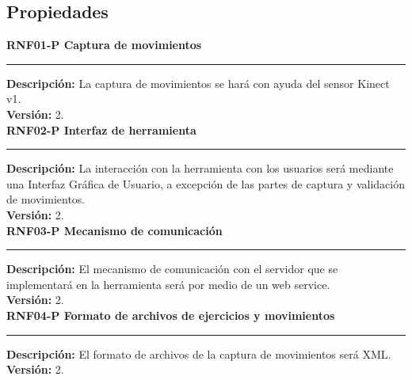 

\subsection{Propiedades}

\textbf{\textcolor[rgb]{0, 0, 0.545098}{RNF01-P \hspace{2cm} Captura de movimientos}}\\
\rule[3mm]{17cm}{0.1mm}
\label{rnf:RNF01-P}
\textbf{Descripción: } La captura de movimientos se hará con ayuda del sensor Kinect v1. \\
\textbf{Versión: } 2. \\

\textbf{\textcolor[rgb]{0, 0, 0.545098}{RNF02-P \hspace{2cm} Interfaz de herramienta}}\\
\rule[3mm]{17cm}{0.1mm}
\label{rnf:RNF02-P}
\textbf{Descripción: } La interacción con la herramienta con los usuarios será mediante una Interfaz Gráfica de Usuario, a excepción de las partes de captura y validación de movimientos. \\
\textbf{Versión: } 2. \\

\textbf{\textcolor[rgb]{0, 0, 0.545098}{RNF03-P \hspace{2cm} Mecanismo de comunicación}}\\
\rule[3mm]{17cm}{0.1mm}
\label{rnf:RNF03-P}
\textbf{Descripción: } El mecanismo de comunicación con el servidor que se implementará en la herramienta será por medio de un web service. \\
\textbf{Versión: } 2. \\

\textbf{\textcolor[rgb]{0, 0, 0.545098}{RNF04-P \hspace{2cm} Formato de archivos de ejercicios y movimientos}}\\
\rule[3mm]{17cm}{0.1mm}
\label{rnf:RNF04-P}
\textbf{Descripción: } El formato de archivos de la captura de movimientos será XML. \\
\textbf{Versión: } 2. \\

\clearpage